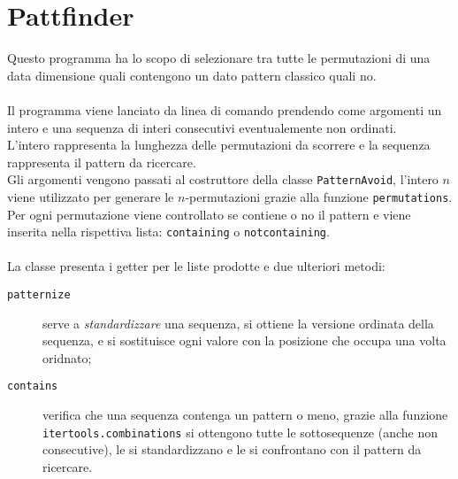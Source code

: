 \section*{Pattfinder}
Questo programma ha lo scopo di selezionare tra tutte le permutazioni di una data dimensione quali contengono un dato pattern classico quali no.\\\\
Il programma viene lanciato da linea di comando prendendo come argomenti un intero e una sequenza di interi consecutivi eventualemente non ordinati.\\
L'intero rappresenta la lunghezza delle permutazioni da scorrere e la sequenza rappresenta il pattern da ricercare.\\
Gli argomenti vengono passati al costruttore della classe \texttt{PatternAvoid}, l'intero $n$ viene utilizzato per generare le $n$-permutazioni grazie alla funzione \texttt{permutations}. Per ogni permutazione viene controllato se contiene o no il pattern e viene inserita nella rispettiva lista: \texttt{containing} o \texttt{notcontaining}.\\\\
La classe presenta i getter per le liste prodotte e due ulteriori metodi: 
\begin{description}
\item[\texttt{patternize}] serve a \textit{standardizzare} una sequenza, si ottiene la versione ordinata della sequenza, e si sostituisce ogni valore con la posizione che occupa una volta oridnato;  
\item[\texttt{contains}] verifica che una sequenza contenga un pattern o meno, grazie alla funzione \texttt{itertools.combinations} si ottengono tutte le sottosequenze (anche non consecutive), le si standardizzano e le si confrontano con il pattern da ricercare.
\end{description}

